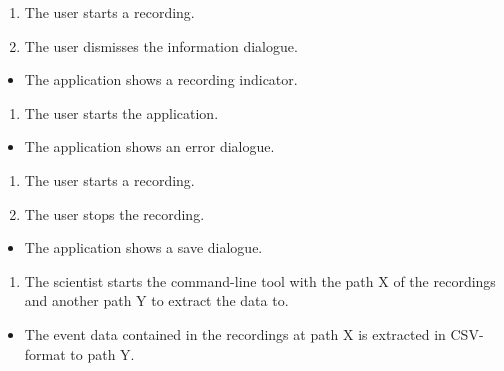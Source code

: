 \begin{tests}
    {\begin{enumerate}
        \item The \gls{user} starts a recording.
        \item The \gls{user} dismisses the information dialogue.
    \end{enumerate}}
    {\begin{itemize}
        \item The application shows a recording indicator.
    \end{itemize}}

    {\begin{enumerate}
        \item The \gls{user} starts the application.
    \end{enumerate}}
    {\begin{itemize}
        \item The application shows an error dialogue.
    \end{itemize}}

    {\begin{enumerate}
        \item The \gls{user} starts a recording.
        \item The \gls{user} stops the recording.
    \end{enumerate}}
    {\begin{itemize}
        \item The application shows a save dialogue.
    \end{itemize}}

    {\begin{enumerate}
        \item The \gls{scientist} starts the command-line tool with the path X of the recordings and another path Y to extract the data to.
    \end{enumerate}}
    {\begin{itemize}
        \item The event data contained in the recordings at path X is extracted in CSV-format to path Y.
    \end{itemize}}


\end{tests}
